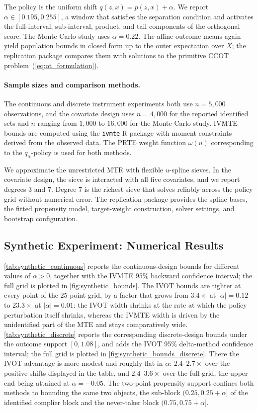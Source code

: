 \noindent The policy is the uniform shift $q(z,x)=p(z,x)+\alpha$. We report $\alpha\in[0.195,0.255]$, a window that satisfies the separation condition and activates the full-interval, sub-interval, product, and tail components of the orthogonal score. The Monte Carlo study uses $\alpha=0.22$. The affine outcome means again yield population bounds in closed form up to the outer expectation over $X$; the replication package compares them with solutions to the primitive CCOT problem~(\ref{eq:ot_formulation}).

\paragraph{Sample sizes and comparison methods.}
The continuous and discrete instrument experiments both use $n=5{,}000$ observations, and the covariate design uses $n=4{,}000$ for the reported identified sets and $n$ ranging from $1{,}000$ to $16{,}000$ for the Monte Carlo study. IVMTE bounds are computed using the \texttt{ivmte} R package with moment constraints derived from the observed data. The PRTE weight function $\omega(u)$ corresponding to the $q_\alpha$-policy is used for both methods.

We approximate the unrestricted MTR with flexible $u$-spline sieves. In the covariate design, the sieve is interacted with all five covariates, and we report degrees $3$ and $7$. Degree $7$ is the richest sieve that solves reliably across the policy grid without numerical error. The replication package provides the spline bases, the fitted propensity model, target-weight construction, solver settings, and bootstrap configuration.

\subsection{Synthetic Experiment: Numerical Results}

\cref{tab:synthetic_continuous} reports the continuous-design bounds for different values of $\alpha > 0$, together with the IVMTE 95\% backward confidence interval; the full grid is plotted in \cref{fig:synthetic_bounds}. The IVOT bounds are tighter at every point of the $25$-point grid, by a factor that grows from $3.4\times$ at $|\alpha| = 0.12$ to $23.3\times$ at $|\alpha| = 0.01$: the IVOT width shrinks at the rate at which the policy perturbation itself shrinks, whereas the IVMTE width is driven by the unidentified part of the MTE and stays comparatively wide. \cref{tab:synthetic_discrete} reports the corresponding discrete-design bounds under the outcome support $[0,1.08]$, and adds the IVOT 95\% delta-method confidence interval; the full grid is plotted in \cref{fig:synthetic_bounds_discrete}. There the IVOT advantage is more modest and roughly flat in $\alpha$: $2.4$--$2.7\times$ over the positive shifts displayed in the table, and $2.4$--$3.6\times$ over the full grid, the upper end being attained at $\alpha = -0.05$. The two-point propensity support confines both methods to bounding the same two objects, the sub-block $(0.25,0.25+\alpha]$ of the identified complier block and the never-taker block $(0.75,0.75+\alpha]$.

